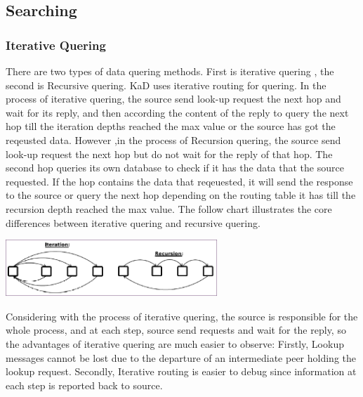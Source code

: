 \subsection{Searching}

\subsubsection{Iterative Quering}
{
There are two types of data quering methods. 
First is iterative quering , the second is Recursive quering.
KaD uses iterative routing for quering.
In the process of iterative quering, the source send look-up request the next hop and wait for its reply, and then according the content of the reply to query the next hop till the iteration depths reached the max value or the source has got the reqeusted data.
However ,in the process of Recursion quering, the source send look-up request the next hop but do not wait for the reply of that hop.
The second hop queries its own database to check if it has the data that the source requested.
If the hop contains the data that reqeuested, it will send the response to the source or query the next hop depending on the routing table it has till the recursion depth reached the max value.
The follow chart illustrates the core differences between iterative quering and recursive quering.
\begin{center}
\includegraphics[width=8cm]{data/IterativeLookup.png}
\end{center}

Considering with the process of iterative quering, the source is responsible for the whole process, and at each step, source send requests and wait for the reply,
so the advantages of iterative quering are much easier to observe:
Firstly, Lookup messages cannot be lost due to the departure of an intermediate peer holding the lookup request.
Secondly, Iterative routing is easier to debug since information at each step is reported back to source.
}



